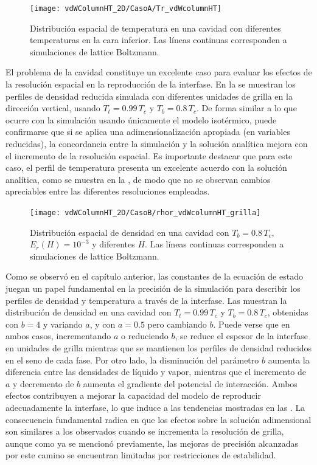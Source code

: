 \begin{figure}[ht]
	\centering
	\texttt{[image: vdWColumnHT\_2D/CasoA/Tr\_vdWcolumnHT]}
	\caption{Distribuci\'on espacial de temperatura en una cavidad con diferentes temperaturas en la cara inferior. Las l\'ineas continuas corresponden a simulaciones de lattice Boltzmann.}
	\label{fig:vdWColumnHT_Tr}
\end{figure}
\FloatBarrier

El problema de la cavidad constituye un excelente caso para evaluar los efectos de la resoluci\'on espacial en la reproducci\'on de la interfase. En la  se muestran los perfiles de densidad reducida simulada con diferentes unidades de grilla en la direcci\'on vertical, usando $T_t = 0.99 \, T_c$ y $T_b = 0.8 \, T_c$. De forma similar a lo que ocurre con la simulaci\'on usando \'unicamente el modelo isot\'ermico, puede confirmarse que si se aplica una adimensionalizaci\'on apropiada (en variables reducidas), la concordancia entre la simulaci\'on y la soluci\'on anal\'itica mejora con el incremento de la resoluci\'on espacial. Es importante destacar que para este caso, el perfil de temperatura presenta un excelente acuerdo con la soluci\'on anal\'itica, como se muestra en la , de modo que no se observan cambios apreciables entre las diferentes resoluciones empleadas.

\begin{figure}[ht]
	\centering
	\texttt{[image: vdWColumnHT\_2D/CasoB/rhor\_vdWcolumnHT\_grilla]}
	\caption{Distribuci\'on espacial de densidad en una cavidad con $T_b = 0.8 \, T_c$, $E_r(H)=10^{-3}$ y diferentes $H$. Las l\'ineas continuas corresponden a simulaciones de lattice Boltzmann.}
	\label{fig:vdWColumnHT_rhor_grilla}
\end{figure}

Como se observ\'o en el cap\'itulo anterior, las constantes de la ecuaci\'on de estado juegan un papel fundamental en la precisi\'on de la simulaci\'on para describir los perfiles de densidad y temperatura a trav\'es de la interfase. Las  muestran la distribuci\'on de densidad en una cavidad con $T_t = 0.99 \, T_c$ y $T_b = 0.8 \, T_c$, obtenidas con $b=4$ y variando $a$, y con $a=0.5$ pero cambiando $b$. Puede verse que en ambos casos, incrementando $a$ o reduciendo $b$, se reduce el espesor de la interfase en unidades de grilla mientras que se mantienen los perfiles de densidad reducidos en el seno de cada fase. Por otro lado, la disminuci\'on del par\'ametro $b$ aumenta la diferencia entre las densidades de l\'iquido y vapor, mientras que el incremento de $a$ y decremento de $b$ aumenta el gradiente del potencial de interacci\'on. Ambos efectos contribuyen a mejorar la capacidad del modelo \pp{} de reproducir adecuadamente la interfase, lo que induce a las tendencias mostradas en las . La consecuencia fundamental radica en que los efectos sobre la soluci\'on adimensional son similares a los observados cuando se incrementa la resoluci\'on de grilla, aunque como ya se mencion\'o previamente, las mejoras de precisi\'on alcanzadas por este camino se encuentran limitadas por restricciones de estabilidad.


